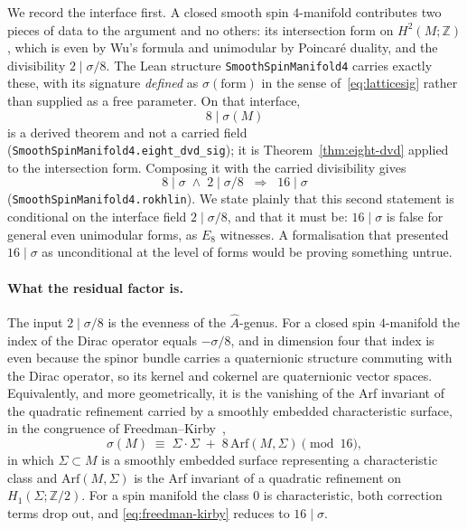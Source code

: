 We record the interface first. A closed smooth spin $4$-manifold
contributes two pieces of data to the argument and no others: its
intersection form on $H^2(M;\mathbb{Z})$, which is even by Wu's formula
and unimodular by Poincar\'e duality, and the divisibility
$2 \mid \sigma/8$. The Lean structure \texttt{SmoothSpinManifold4}
carries exactly these, with its signature \emph{defined} as
$\sigma(\text{form})$ in the sense of~\eqref{eq:latticesig} rather than
supplied as a free parameter. On that interface,
\begin{equation}
8 \mid \sigma(M)
\label{eq:interface-eight}
\end{equation}
is a derived theorem and not a carried field
(\texttt{SmoothSpinManifold4.eight\_dvd\_sig}); it is
Theorem~\ref{thm:eight-dvd} applied to the intersection form. Composing
it with the carried divisibility gives
\begin{equation}
8 \mid \sigma \;\wedge\; 2 \mid \sigma/8
\;\;\Longrightarrow\;\; 16 \mid \sigma
\label{eq:compose}
\end{equation}
(\texttt{SmoothSpinManifold4.rokhlin}). We state plainly that this second
statement is conditional on the interface field $2\mid\sigma/8$, and that
it must be: $16\mid\sigma$ is false for general even unimodular forms, as
$E_8$ witnesses. A formalisation that presented $16\mid\sigma$ as
unconditional at the level of forms would be proving something untrue.

\paragraph{What the residual factor is.}
The input $2\mid\sigma/8$ is the evenness of the $\hat A$-genus. For a
closed spin $4$-manifold the index of the Dirac operator equals
$-\sigma/8$, and in dimension four that index is even because the spinor
bundle carries a quaternionic structure commuting with the Dirac
operator, so its kernel and cokernel are quaternionic vector spaces.
Equivalently, and more geometrically, it is the vanishing of the Arf
invariant of the quadratic refinement carried by a smoothly embedded
characteristic surface, in the congruence of
Freedman--Kirby~\cite{FreedmanKirby1978},
\begin{equation}
\sigma(M) \;\equiv\; \Sigma\cdot\Sigma \;+\; 8\,\mathrm{Arf}(M,\Sigma)
\pmod{16},
\label{eq:freedman-kirby}
\end{equation}
in which $\Sigma \subset M$ is a smoothly embedded surface representing a
characteristic class and $\mathrm{Arf}(M,\Sigma)$ is the Arf invariant of
a quadratic refinement on $H_1(\Sigma;\mathbb{Z}/2)$. For a spin manifold
the class $0$ is characteristic, both correction terms drop out, and
\eqref{eq:freedman-kirby} reduces to $16\mid\sigma$.

